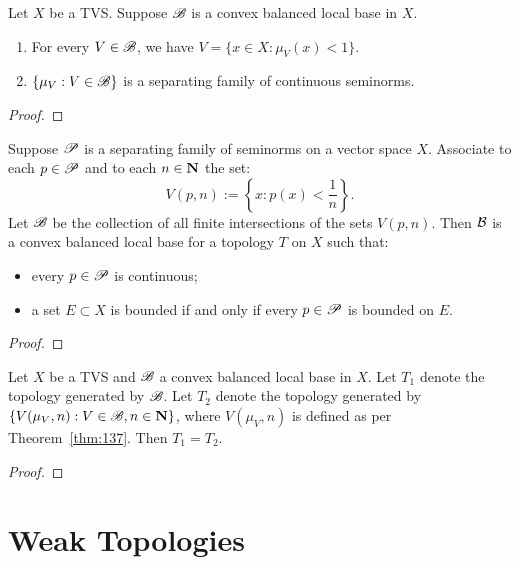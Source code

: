 \begin{theorem}
	Let $X$ be a TVS. Suppose $\mathscr{B}$ is a convex balanced local base in $X$.
	\mbox{}
	\begin{enumerate}[label = (\alph*),itemsep=1pt,topsep=3pt]
		\item For every $V \in \mathscr{B}$, we have $V = \{x \in X : \mu_V(x) < 1\}$.
		\item $\{\mu_V : V \in \mathscr{B}\}$ is a separating family of continuous seminorms.
	\end{enumerate}
\end{theorem}
	{\color{red}
	\begin{proof}
			
	\end{proof}}

\begin{theorem}\label{thm:137}
	Suppose $\mathscr{P}$ is a separating family of seminorms on a vector space $X$. Associate to each $p \in \mathscr{P}$ and to each $n \in \mathbf{N}$ the set:
	\[
		V(p,n) := \left\{ x:p(x) < \frac{1}{n} \right\}.
	\] 
	Let $\mathscr{B}$ be the collection of all finite intersections of the sets $V(p,n)$. Then $\mathcal{B}$ is a convex balanced local base for a topology $T$ on $X$ such that:
	\mbox{}
	\begin{itemize}[itemsep=1pt,topsep=3pt]
		\item every $p \in \mathscr{P}$ is continuous;
		\item a set $E \subset X$ is bounded if and only if every $p \in \mathscr{P}$ is bounded on $E$.
	\end{itemize}
\end{theorem}
	{\color{red}
	\begin{proof}
			
	\end{proof}}

\begin{theorem}
	Let $X$ be a TVS and $\mathscr{B}$ a convex balanced local base in $X$. Let $T_1$ denote the topology generated by $\mathscr{B}$. Let $T_2$ denote the topology generated by $\{V(\mu_V,n):V \in \mathscr{B}, n \in \mathbf{N}\}$, where $V(\mu_V,n)$ is defined as per Theorem~\ref{thm:137}. Then $T_1 = T_2$.
\end{theorem}
	{\color{red}
	\begin{proof}
			
	\end{proof}}

\section{Weak Topologies}

